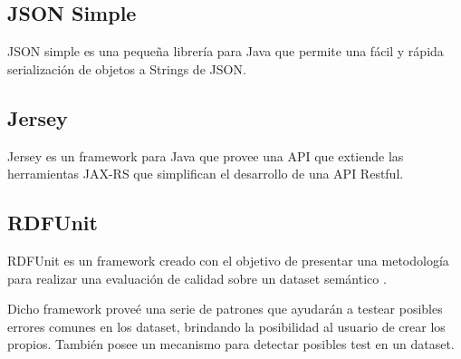 \subsection{JSON Simple}

JSON simple es una pequeña librería para Java que permite una fácil y rápida serialización de objetos a 
Strings de JSON.

\subsection{Jersey}

Jersey es un framework para Java que provee una API que extiende las herramientas JAX-RS que simplifican el 
desarrollo de una API Restful. 

\subsection{RDFUnit}

RDFUnit es un framework creado con el objetivo de presentar una metodología para realizar una evaluación 
de calidad sobre un dataset semántico \cite{Kontokostas2014}.

Dicho framework proveé una serie de patrones que ayudarán a testear posibles errores comunes en los dataset, brindando la posibilidad 
al usuario de crear los propios. También posee un mecanismo para detectar posibles test en un dataset.